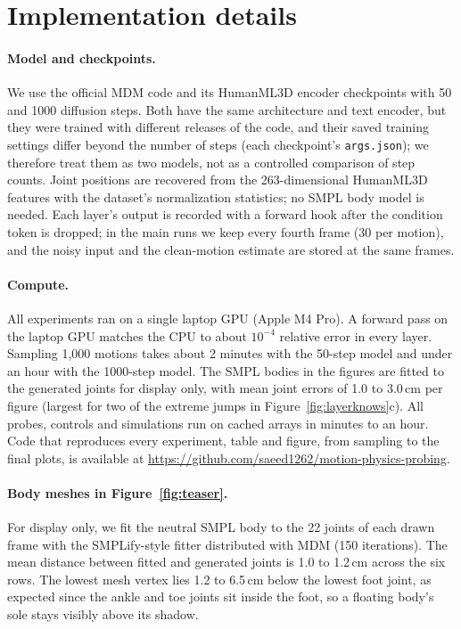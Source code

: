 \section{Implementation details}
\label{app:impl}

\paragraph{Model and checkpoints.} We use the official MDM code \citep{tevet2023mdm} and its HumanML3D encoder checkpoints with 50 and 1000 diffusion steps. Both have the same architecture and text encoder, but they were trained with different releases of the code, and their saved training settings differ beyond the number of steps (each checkpoint's \texttt{args.json}); we therefore treat them as two models, not as a controlled comparison of step counts. Joint positions are recovered from the 263-dimensional HumanML3D features with the dataset's normalization statistics; no SMPL body model is needed. Each layer's output is recorded with a forward hook after the condition token is dropped; in the main runs we keep every fourth frame (30 per motion), and the noisy input and the clean-motion estimate are stored at the same frames.

\paragraph{Compute.} All experiments ran on a single laptop GPU (Apple M4 Pro). A forward pass on the laptop GPU matches the CPU to about $10^{-4}$ relative error in every layer. Sampling 1,000 motions takes about 2 minutes with the 50-step model and under an hour with the 1000-step model. The SMPL bodies in the figures are fitted to the generated joints for display only, with mean joint errors of 1.0 to 3.0\,cm per figure (largest for two of the extreme jumps in Figure~\ref{fig:layerknows}c). All probes, controls and simulations run on cached arrays in minutes to an hour. Code that reproduces every experiment, table and figure, from sampling to the final plots, is available at \url{https://github.com/saeed1262/motion-physics-probing}.

\paragraph{Body meshes in Figure~\ref{fig:teaser}.} For display only, we fit the neutral SMPL body \citep{loper2015smpl} to the 22 joints of each drawn frame with the SMPLify-style fitter distributed with MDM \citep{bogo2016keep} (150 iterations). The mean distance between fitted and generated joints is 1.0 to 1.2\,cm across the six rows. The lowest mesh vertex lies 1.2 to 6.5\,cm below the lowest foot joint, as expected since the ankle and toe joints sit inside the foot, so a floating body's sole stays visibly above its shadow.

